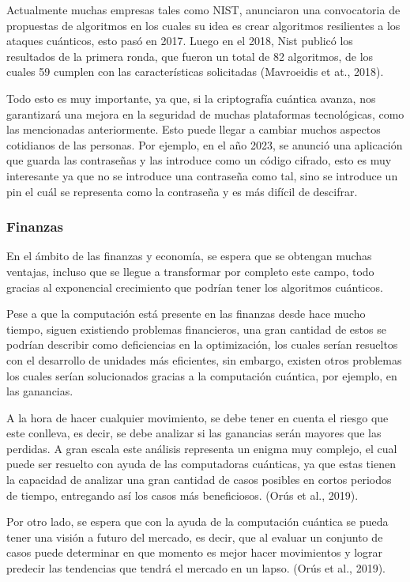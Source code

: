 \documentclass[twoside]{article}
\begin{document}
Actualmente muchas empresas tales como NIST, anunciaron una convocatoria de propuestas de algoritmos en los cuales su idea es crear algoritmos resilientes a los ataques cuánticos, esto pasó en 2017. Luego en el 2018, Nist publicó los resultados de la primera ronda, que fueron un total de 82 algoritmos, de los cuales 59 cumplen con las características solicitadas (Mavroeidis et at., 2018). 

Todo esto es muy importante, ya que, si la criptografía cuántica avanza, nos garantizará una mejora en la seguridad de muchas plataformas tecnológicas, como las mencionadas anteriormente. Esto puede llegar a cambiar muchos aspectos cotidianos de las personas. Por ejemplo, en el año 2023, se anunció una aplicación que guarda las contraseñas y las introduce como un código cifrado, esto es muy interesante ya que no se introduce una contraseña como tal, sino se introduce un pin el cuál se representa como la contraseña y es más difícil de descifrar. 


 \subsubsection{Finanzas} 
En el ámbito de las finanzas y economía, se espera que se obtengan muchas ventajas, incluso que se llegue a transformar por completo este campo, todo gracias al exponencial crecimiento que podrían tener los algoritmos cuánticos.
 
Pese a que la computación está presente en las finanzas desde hace mucho tiempo, siguen existiendo problemas financieros, una gran cantidad de estos se podrían describir como deficiencias en la optimización, los cuales serían resueltos con el desarrollo de unidades más eficientes, sin embargo, existen otros problemas los cuales serían solucionados gracias a la computación cuántica, por ejemplo, en las ganancias. 

A la hora de hacer cualquier movimiento, se debe tener en cuenta el riesgo que este conlleva, es decir, se debe analizar si las ganancias serán mayores que las perdidas. A gran escala este análisis representa un enigma muy complejo, el cual puede ser resuelto con ayuda de las computadoras cuánticas, ya que estas tienen la capacidad de analizar una gran cantidad de casos posibles en cortos periodos de tiempo, entregando así los casos más beneficiosos. (Orús et al., 2019).

Por otro lado, se espera que con la ayuda de la computación cuántica se pueda tener una visión a futuro del mercado, es decir, que al evaluar un conjunto de casos puede determinar en que momento es mejor hacer movimientos y lograr predecir las tendencias que tendrá el mercado en un lapso. (Orús et al., 2019).
\end{document}
